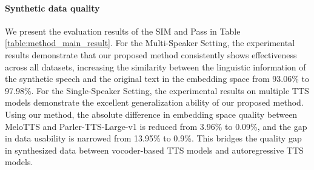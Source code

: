 \documentclass[11pt]{article}
\begin{document}
    \begin{table}[htb]
	\centering
	\caption{Evaluation results of different ASR methods under the Multi-Speaker Setting. Using WER as the evaluation metric.}
	\label{table:asr_result}
\end{table}
	
	\paragraph{Synthetic data quality}
	We present the evaluation results of the SIM and Pass in Table \ref{table:method_main_result}. For the Multi-Speaker Setting, the experimental results demonstrate that our proposed method consistently shows effectiveness across all datasets, increasing the similarity between the linguistic information of the synthetic speech and the original text in the embedding space from 93.06\% to 97.98\%.  For the Single-Speaker Setting, the experimental results on multiple TTS models demonstrate the excellent generalization ability of our proposed method. Using our method, the absolute difference in embedding space quality between MeloTTS and Parler-TTS-Large-v1 is reduced from 3.96\% to 0.09\%, and the gap in data usability is narrowed from 13.95\% to 0.9\%. This bridges the quality gap in synthesized data between vocoder-based TTS models and autoregressive TTS models.
\end{document}
